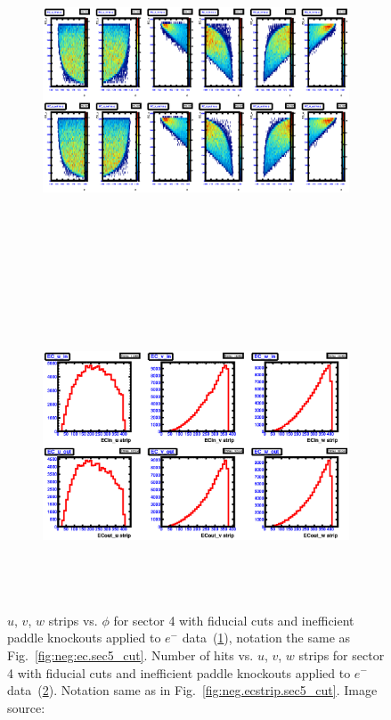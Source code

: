 \begin{figure}[!ht]
  \centering
  \begin{subfigure}[b]{\figwidth}
  \includegraphics[width=\figwidth, height=3.5in,valign=c]{figures/calib/ec/pim_ecuvw_phi_afterGeoFid_sec4.eps}\caption{}\label{fig:EC_III_IV}
  \end{subfigure}%
  \\
  \begin{subfigure}[b]{\figwidth}
  \includegraphics[width=\figwidth, height=3.5in,valign=c]{figures/calib/ec/pim_ecuvw_afterGeoFid_sec4.eps}\caption{}\label{fig:EC_IV_IV}
  \end{subfigure}%
      \caption { $u$, $v$, $w$ strips vs. $\phi$ for sector 4 with fiducial cuts and inefficient paddle knockouts applied to $e^-$ data~(\ref{fig:EC_III_IV}), notation the same as Fig.~\ref{fig:neg:ec.sec5_cut}. Number of hits vs.  $u$, $v$, $w$ strips for sector 4 with fiducial cuts and inefficient paddle knockouts applied to $e^-$ data~(\ref{fig:EC_IV_IV}). Notation same as in Fig.~\ref{fig:neg.ecstrip.sec5_cut}. Image source:~\cite{clas.thesis.kunkel}}
        \label{fig:EC_cut_IV}
\end{figure}


